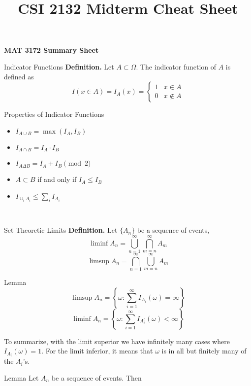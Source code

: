 \documentclass{article}
\title{CSI 2132 Midterm Cheat Sheet}
\begin{document}
\begin{center}{\large{\textbf{MAT 3172 Summary Sheet}}}\\
\end{center}




\begin{multicols*}{3}
\begin{blackbox}{Indicator Functions}
    \textbf{Definition.} Let $A \subset \Omega$. The indicator function of $A$ is defined as 
    \[I(x \in A) = I_A(x) = \begin{cases}
        1 & x \in A \\
        0 & x \notin A
    \end{cases}\]
    \begin{bluebox}{Properties of Indicator Functions}
        \begin{itemize}
            \item $I_{A \cup B} = \max(I_A, I_B)$
            \item $I_{A \cap B} = I_A \cdot I_B$
            \item $I_{A \Delta B} = I_A + I_B \pmod{2}$
            \item $A \subset B$ if and only if $I_A \leq I_B$
            \item $I_{\cup_i A_i} \leq \sum_i I_{A_i}$
        \end{itemize}
    \end{bluebox}\\[-2ex]
\end{blackbox}
\begin{blackbox}{Set Theoretic Limits}
    \textbf{Definition.} Let $\{A_n\}$ be a sequence of events,
    \[\liminf A_n = \bigcup_{n=1}^\infty \bigcap_{m=n}^\infty A_m\]
    \[\limsup A_n = \bigcap_{n=1}^\infty \bigcup_{m=n}^\infty A_m\]
    \begin{redbox}{Lemma}
        \[\limsup A_n = \left\{
            \omega: \sum_{i=1}^\infty I_{A_i}(\omega) = \infty
        \right\}\]
        \[\liminf A_n = \left\{
            \omega: \sum_{i=1}^\infty I_{A_i^c}(\omega) < \infty
        \right\}\]
    \end{redbox}
    To summarize, with the limit superior we have infinitely many cases where
    $I_{A_i} (\omega) = 1$. For the limit inferior, it means that $\omega$ is in all but finitely many of
    the $A_i$’s.
    \begin{brownbox}{Lemma}
        Let ${A_n}$ be a sequence of events. Then
        \begin{enumerate}

\end{enumerate}
\end{brownbox}
\end{blackbox}
\end{multicols*}
\end{document}
